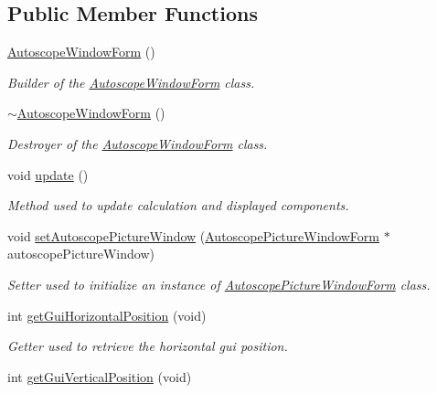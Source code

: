 \subsection*{Public Member Functions}
\begin{DoxyCompactItemize}
\item 
\hyperlink{class_autoscope_window_form_abff392139c212a6f9e183d3984a02a47}{Autoscope\+Window\+Form} ()
\begin{DoxyCompactList}\small\item\em Builder of the \hyperlink{class_autoscope_window_form}{Autoscope\+Window\+Form} class. \end{DoxyCompactList}\item 
\hyperlink{class_autoscope_window_form_a2a7cceef655815a6c6ee1cc65a40fa8d}{$\sim$\+Autoscope\+Window\+Form} ()
\begin{DoxyCompactList}\small\item\em Destroyer of the \hyperlink{class_autoscope_window_form}{Autoscope\+Window\+Form} class. \end{DoxyCompactList}\item 
void \hyperlink{class_autoscope_window_form_a732f751b8de766e03f5f79a7a08db136}{update} ()
\begin{DoxyCompactList}\small\item\em Method used to update calculation and displayed components. \end{DoxyCompactList}\item 
void \hyperlink{class_autoscope_window_form_a4308f566557feaba98e031e28e527812}{set\+Autoscope\+Picture\+Window} (\hyperlink{class_autoscope_picture_window_form}{Autoscope\+Picture\+Window\+Form} $\ast$autoscope\+Picture\+Window)
\begin{DoxyCompactList}\small\item\em Setter used to initialize an instance of \hyperlink{class_autoscope_picture_window_form}{Autoscope\+Picture\+Window\+Form} class. \end{DoxyCompactList}\item 
int \hyperlink{class_autoscope_window_form_ad065e4a2a518d779407238e3c258f6e6}{get\+Gui\+Horizontal\+Position} (void)
\begin{DoxyCompactList}\small\item\em Getter used to retrieve the horizontal gui position. \end{DoxyCompactList}\item 
int \hyperlink{class_autoscope_window_form_a0d92cd0c7342749009e12058517ba060}{get\+Gui\+Vertical\+Position} (void)

\end{DoxyCompactItemize}
